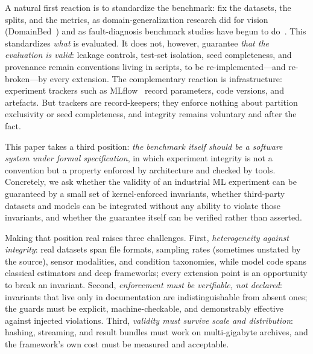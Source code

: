 A natural first reaction is to standardize the benchmark: fix the datasets,
the splits, and the metrics, as domain-generalization research did for vision
(DomainBed~\cite{gulrajani2021domainbed}) and as fault-diagnosis benchmark
studies have begun to do~\cite{zhao2024dgbenchmark,dgbenchmarkrepo}. This
standardizes \emph{what} is evaluated. It does not, however, guarantee
\emph{that the evaluation is valid}: leakage controls, test-set isolation,
seed completeness, and provenance remain conventions living in scripts, to be
re-implemented---and re-broken---by every extension. The complementary
reaction is infrastructure: experiment trackers such as MLflow~\cite{mlflow}
record parameters, code versions, and artefacts. But trackers are
record-keepers; they enforce nothing about partition exclusivity or seed
completeness, and integrity remains voluntary and after the fact.

This paper takes a third position: \emph{the benchmark itself should be a
software system under formal specification}, in which experiment integrity is
not a convention but a property enforced by architecture and checked by
tools. Concretely, we ask whether the validity of an industrial ML experiment
can be guaranteed by a small set of kernel-enforced invariants, whether
third-party datasets and models can be integrated without any ability to
violate those invariants, and whether the guarantee itself can be verified
rather than asserted.

Making that position real raises three challenges. First,
\emph{heterogeneity against integrity}: real datasets span file formats,
sampling rates (sometimes unstated by the source), sensor modalities, and
condition taxonomies, while model code spans classical estimators and deep
frameworks; every extension point is an opportunity to break an invariant.
Second, \emph{enforcement must be verifiable, not declared}: invariants that
live only in documentation are indistinguishable from absent ones; the guards
must be explicit, machine-checkable, and demonstrably effective against
injected violations. Third, \emph{validity must survive scale and
distribution}: hashing, streaming, and result bundles must work on
multi-gigabyte archives, and the framework's own cost must be measured and
acceptable.

